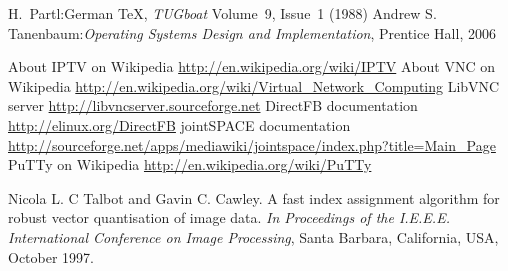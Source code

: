 \renewcommand{\bibname}{References}
\bibintoc %
\begin{thebibliography}{20}
 H.~Partl:German \TeX, \emph{TUGboat} Volume~9, Issue~1 (1988)
 Andrew S. Tanenbaum:\emph{Operating Systems Design and Implementation}, Prentice Hall, 2006

 About IPTV on Wikipedia \url{http://en.wikipedia.org/wiki/IPTV}
 About VNC on Wikipedia \url{http://en.wikipedia.org/wiki/Virtual_Network_Computing}
LibVNC server \url{http://libvncserver.sourceforge.net}
DirectFB documentation \url{http://elinux.org/DirectFB}
jointSPACE documentation \url{http://sourceforge.net/apps/mediawiki/jointspace/index.php?title=Main_Page}
PuTTy on Wikipedia \url{http://en.wikipedia.org/wiki/PuTTy}

 Nicola L. C Talbot and Gavin C. Cawley. A fast index assignment algorithm for robust vector quantisation of image data. \emph{In Proceedings of the I.E.E.E. International Conference on Image Processing}, Santa Barbara, California, USA,  October 1997.

\end{thebibliography}

